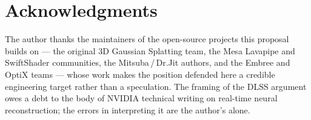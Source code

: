 \documentclass[10pt,journal]{IEEEtran}
\begin{document}
\section*{Acknowledgments}
The author thanks the maintainers of the open-source projects this
proposal builds on --- the original 3D Gaussian Splatting team, the
Mesa Lavapipe and SwiftShader communities, the Mitsuba\,/\,Dr.Jit
authors, and the Embree and OptiX teams --- whose work makes the
position defended here a credible engineering target rather than a
speculation. The framing of the DLSS argument owes a debt to the body
of NVIDIA technical writing on real-time neural reconstruction; the
errors in interpreting it are the author's alone.



\end{document}
